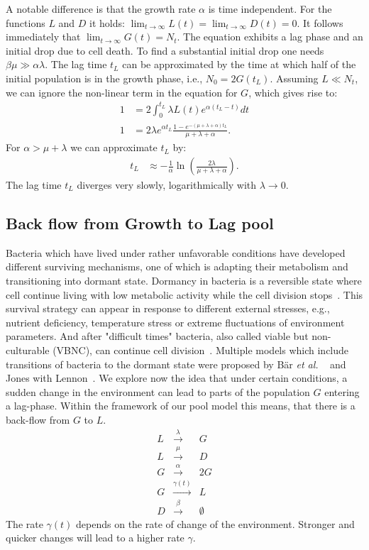\documentclass[10pt,A4paper]{article}
\numberwithin{equation}{section}
\newcommand{\etal}{{\textit{et al. }}}
\begin{document}
A notable difference is that the growth rate $\alpha$ is time independent.
For the functions $L$ and $D$ it holds: $\lim_{t\to\infty} L(t) = \lim_{t\to\infty} D(t) = 0$.
It follows immediately that $\lim_{t\to\infty} G(t) = N_t$.
The equation exhibits a lag phase and an initial drop due to cell death.
To find a substantial initial drop one needs $\beta \mu \gg \alpha \lambda$.
The lag time $t_L$ can be approximated by the time at which half of the initial population is in the growth phase, i.e., $N_0=2G(t_L)$.
Assuming $L\ll N_t$, we can ignore the non-linear term in the equation for $G$, which gives rise to:
\begin{align}
    1&= 2\int_0^{t_L} \lambda L(t)e^{\alpha(t_L-t)}dt\\
    1  &= 2\lambda e^{\alpha t_L}\frac{1-e^{-(\mu+\lambda+\alpha)t_L}}{\mu+\lambda+\alpha}.
\end{align}
For $\alpha > \mu+\lambda$  we can approximate $t_L$ by:
\begin{align}
    t_L &\approx -\frac{1}{\alpha}\ln\left(\frac{2\lambda}{\mu+\lambda+\alpha}\right).
\end{align}
The lag time $t_L$ diverges very slowly, logarithmically with $\lambda\to 0$.
%
%
%
\subsection{Back flow from Growth to Lag pool}
Bacteria which have lived under rather unfavorable conditions have developed different surviving mechanisms, one of which is adapting their metabolism and transitioning into dormant state.
Dormancy in bacteria is a reversible state where cell continue living with low metabolic activity while the cell division stops~\cite{kaprelyants_dormancy_1993}.
This survival strategy can appear in response to different external stresses, e.g., nutrient deficiency, temperature stress or extreme fluctuations of environment parameters.
And after "difficult times" bacteria, also called viable but non-culturable (VBNC), can continue cell division~\cite{kell_viability_1998}.
Multiple models which include transitions of bacteria to the dormant state were proposed by Bär \etal~\cite{bar_modelling_2002} and Jones with Lennon~\cite{jones_dormancy_2010}.
%
We explore now the idea that under certain conditions, a sudden change in the environment can lead to parts of the population $G$ entering a lag-phase.
Within the framework of our pool model this means, that there is a back-flow from $G$ to $L$.
\begin{eqnarray}
    L &\stackrel{\lambda}{\longrightarrow} & G\\
    L &\stackrel{\mu}{\longrightarrow} & D\\
    G &\stackrel{\alpha}{\longrightarrow} & 2G\\
    G &\stackrel{\gamma(t)}{\longrightarrow} & L\\
    D &\stackrel{\beta}{\longrightarrow} & \emptyset
\end{eqnarray}
The rate $\gamma(t)$ depends on the rate of change of the environment.
Stronger and quicker changes will lead to a higher rate $\gamma$.
%
%
\end{document}
